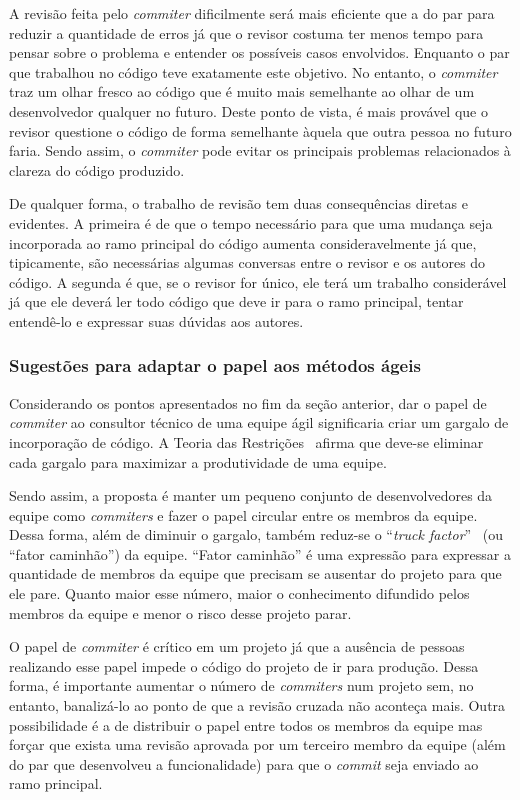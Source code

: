 A revisão feita pelo \emph{commiter} dificilmente será mais eficiente
que a do par para reduzir a quantidade de erros já que o revisor
costuma ter menos tempo para pensar sobre o problema e entender os
possíveis casos envolvidos. Enquanto o par que trabalhou no código
teve exatamente este objetivo. No entanto, o \emph{commiter} traz um
olhar fresco ao código que é muito mais semelhante ao olhar de um
desenvolvedor qualquer no futuro. Deste ponto de vista, é mais
provável que o revisor questione o código de forma semelhante àquela
que outra pessoa no futuro faria. Sendo assim, o \emph{commiter} pode
evitar os principais problemas relacionados à clareza do código
produzido.

De qualquer forma, o trabalho de revisão tem duas consequências
diretas e evidentes. A primeira é de que o tempo necessário para que
uma mudança seja incorporada ao ramo principal do código aumenta
consideravelmente já que, tipicamente, são necessárias algumas
conversas entre o revisor e os autores do código. A segunda é que, se
o revisor for único, ele terá um trabalho considerável já que ele deverá
ler todo código que deve ir para o ramo principal, tentar entendê-lo e
expressar suas dúvidas aos autores.

\subsubsection{Sugestões para adaptar o papel aos métodos ágeis}

Considerando os pontos apresentados no fim da seção anterior, dar o
papel de \emph{commiter} ao consultor técnico de uma equipe ágil
significaria criar um gargalo de incorporação de código. A Teoria das
Restrições~\cite{goldratt84} afirma que deve-se eliminar cada gargalo
para maximizar a produtividade de uma equipe.


Sendo assim, a proposta é manter um pequeno conjunto de
desenvolvedores da equipe como \emph{commiters} e fazer o papel
circular entre os membros da equipe. Dessa forma, além de diminuir o
gargalo, também reduz-se o ``\textit{truck
  factor}''~\cite{Williams2002} (ou ``fator caminhão'') da
equipe. ``Fator caminhão'' é uma expressão para expressar a quantidade
de membros da equipe que precisam se ausentar do projeto para que ele
pare. Quanto maior esse número, maior o conhecimento difundido pelos
membros da equipe e menor o risco desse projeto parar.

O papel de \emph{commiter} é crítico em um projeto já que a ausência
de pessoas realizando esse papel impede o código do projeto de ir para
produção. Dessa forma, é importante aumentar o número de
\emph{commiters} num projeto sem, no entanto, banalizá-lo ao ponto de
que a revisão cruzada não aconteça mais. Outra possibilidade é a de
distribuir o papel entre todos os membros da equipe mas forçar que
exista uma revisão aprovada por um terceiro membro da equipe (além do
par que desenvolveu a funcionalidade) para que o \emph{commit} seja
enviado ao ramo principal.

